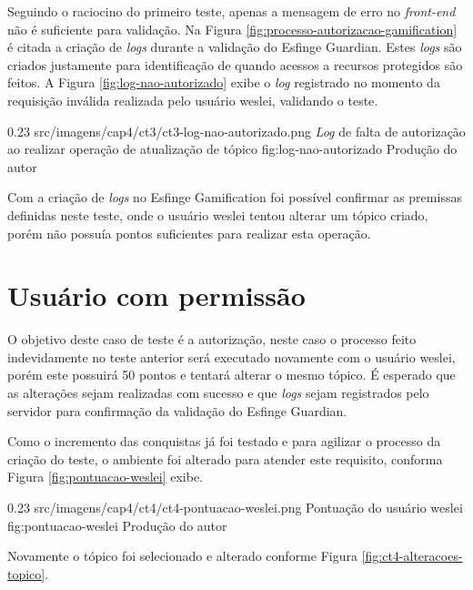 \par Seguindo o raciocino do primeiro teste, apenas a mensagem de erro no \textit{front-end} não é suficiente para validação. Na Figura \ref{fig:processo-autorizacao-gamification} é citada a criação de \textit{logs} durante a validação do Esfinge Guardian. Estes \textit{logs} são criados justamente para identificação de quando acessos a recursos protegidos são feitos. A Figura \ref{fig:log-nao-autorizado} exibe o \textit{log} registrado no momento da requisição inválida realizada pelo usuário weslei, validando o teste.

\begin{image}
{0.23}
{src/imagens/cap4/ct3/ct3-log-nao-autorizado.png}
{\textit{Log} de falta de autorização ao realizar operação de atualização de tópico}
{fig:log-nao-autorizado}
{Produção do autor}
\end{image}

\par Com a criação de \textit{logs} no Esfinge Gamification foi possível confirmar as premissas definidas neste teste, onde o usuário weslei tentou alterar um tópico criado, porém não possuía pontos suficientes para realizar esta operação.

\section{Usuário com permissão}

\par O objetivo deste caso de teste é a autorização, neste caso o processo feito indevidamente no teste anterior será executado novamente com o usuário weslei, porém este possuirá 50 pontos e tentará alterar o mesmo tópico. É esperado que as alterações sejam realizadas com sucesso e que \textit{logs} sejam registrados pelo servidor para confirmação da validação do Esfinge Guardian.

\par Como o incremento das conquistas já foi testado e para agilizar o processo da criação do teste, o ambiente foi alterado para atender este requisito, conforma Figura \ref{fig:pontuacao-weslei} exibe.

\begin{image}
{0.23}
{src/imagens/cap4/ct4/ct4-pontuacao-weslei.png}
{Pontuação do usuário weslei}
{fig:pontuacao-weslei}
{Produção do autor}
\end{image}

\par Novamente o tópico foi selecionado e alterado conforme Figura \ref{fig:ct4-alteracoes-topico}.

